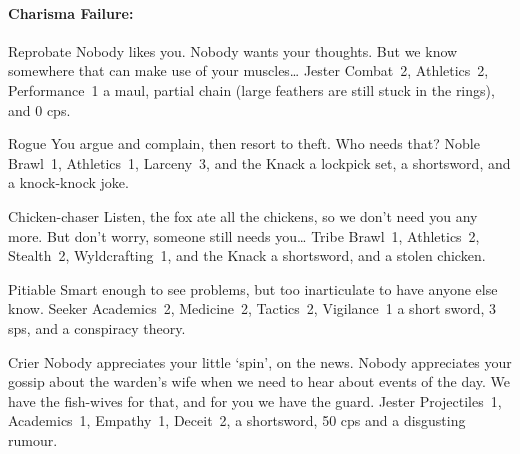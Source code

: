 \begin{multicols}{2}
\begin{itemize}
\end{itemize}

\paragraph{Charisma Failure:}

\begin{itemize}

  {Reprobate}%
  {Nobody likes you.
  Nobody wants your thoughts.
  But we know somewhere that can make use of your muscles\ldots
  }%
  {Jester}%
  {Combat~2, Athletics~2, Performance~1}%
  {a maul, partial chain (large feathers are still stuck in the rings), and 0 \glspl{cp}.}%

  {Rogue}%
  {You argue and complain, then resort to theft.
  Who needs that?
  }%
  {Noble}%
  {Brawl~1, Athletics~1, Larceny~3, and the Knack \lucky}%
  {a lockpick set, a shortsword, and a knock-knock joke.}%

  {Chicken-chaser}%
  {Listen, the fox ate all the chickens, so we don't need you any more.
  But don't worry, someone still needs you\ldots
  }%
  {Tribe}%
  {Brawl~1, Athletics~2, Stealth~2, Wyldcrafting~1, and the Knack \lucky}%
  {a shortsword, and a stolen chicken.}%

  {Pitiable}%
  {Smart enough to see problems, but too inarticulate to have anyone else know.
  }%
  {Seeker}%
  {Academics~2, Medicine~2, Tactics~2, Vigilance~1}%
  {a short sword, 3 \glspl{sp}, and a conspiracy theory.}%

  {Crier}%
  {Nobody appreciates your little `spin', on the news.
  Nobody appreciates your gossip about the warden's wife when we need to hear about events of the day.
  We have the fish-wives for that, and for you we have the \gls{guard}.
  }%
  {Jester}%
  {Projectiles~1, Academics~1, Empathy~1, Deceit~2, }%
  {a shortsword, 50 \glspl{cp} and a disgusting rumour.}%

\end{itemize}

\end{multicols}
